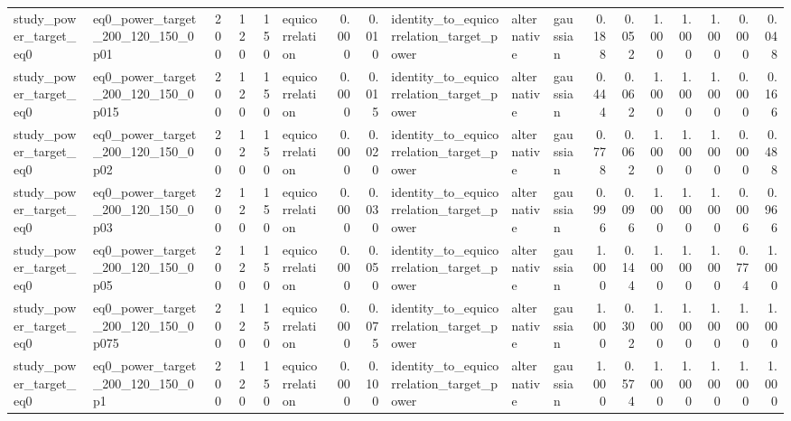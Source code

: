 \begin{tabular}{llrrrlrrlllrrrrrrr}
study\_power\_target\_eq0 & eq0\_power\_target\_200\_120\_150\_0p01 & 200 & 120 & 150 & equicorrelation & 0.000 & 0.010 & identity\_to\_equicorrelation\_target\_power & alternative & gaussian & 0.188 & 0.052 & 1.000 & 1.000 & 1.000 & 0.000 & 0.048 \\
study\_power\_target\_eq0 & eq0\_power\_target\_200\_120\_150\_0p015 & 200 & 120 & 150 & equicorrelation & 0.000 & 0.015 & identity\_to\_equicorrelation\_target\_power & alternative & gaussian & 0.444 & 0.062 & 1.000 & 1.000 & 1.000 & 0.000 & 0.166 \\
study\_power\_target\_eq0 & eq0\_power\_target\_200\_120\_150\_0p02 & 200 & 120 & 150 & equicorrelation & 0.000 & 0.020 & identity\_to\_equicorrelation\_target\_power & alternative & gaussian & 0.778 & 0.062 & 1.000 & 1.000 & 1.000 & 0.000 & 0.488 \\
study\_power\_target\_eq0 & eq0\_power\_target\_200\_120\_150\_0p03 & 200 & 120 & 150 & equicorrelation & 0.000 & 0.030 & identity\_to\_equicorrelation\_target\_power & alternative & gaussian & 0.996 & 0.096 & 1.000 & 1.000 & 1.000 & 0.006 & 0.966 \\
study\_power\_target\_eq0 & eq0\_power\_target\_200\_120\_150\_0p05 & 200 & 120 & 150 & equicorrelation & 0.000 & 0.050 & identity\_to\_equicorrelation\_target\_power & alternative & gaussian & 1.000 & 0.144 & 1.000 & 1.000 & 1.000 & 0.774 & 1.000 \\
study\_power\_target\_eq0 & eq0\_power\_target\_200\_120\_150\_0p075 & 200 & 120 & 150 & equicorrelation & 0.000 & 0.075 & identity\_to\_equicorrelation\_target\_power & alternative & gaussian & 1.000 & 0.302 & 1.000 & 1.000 & 1.000 & 1.000 & 1.000 \\
study\_power\_target\_eq0 & eq0\_power\_target\_200\_120\_150\_0p1 & 200 & 120 & 150 & equicorrelation & 0.000 & 0.100 & identity\_to\_equicorrelation\_target\_power & alternative & gaussian & 1.000 & 0.574 & 1.000 & 1.000 & 1.000 & 1.000 & 1.000 \\
\bottomrule
\end{tabular}
